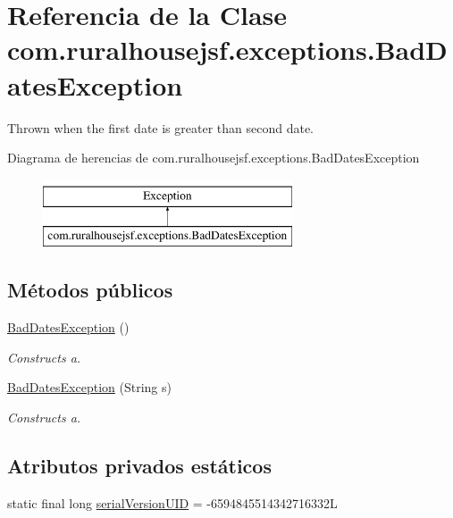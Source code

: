 \hypertarget{a00208}{}\section{Referencia de la Clase com.\+ruralhousejsf.\+exceptions.\+Bad\+Dates\+Exception}
\label{a00208}


Thrown when the first date is greater than second date.  


Diagrama de herencias de com.\+ruralhousejsf.\+exceptions.\+Bad\+Dates\+Exception\begin{figure}[H]
\begin{center}
\leavevmode
\includegraphics[height=2.000000cm]{a00208}
\end{center}
\end{figure}
\subsection*{Métodos públicos}
\begin{DoxyCompactItemize}
\item 
\mbox{\hyperlink{a00208_a0e519d0653a6b74703c8d586c3dca1bc}{Bad\+Dates\+Exception}} ()
\begin{DoxyCompactList}\small\item\em Constructs a. \end{DoxyCompactList}\item 
\mbox{\hyperlink{a00208_ace7222589b4c31c6b4a3d44d952c512a}{Bad\+Dates\+Exception}} (String s)
\begin{DoxyCompactList}\small\item\em Constructs a. \end{DoxyCompactList}\end{DoxyCompactItemize}
\subsection*{Atributos privados estáticos}
\begin{DoxyCompactItemize}
\item 
static final long \mbox{\hyperlink{a00208_a455e5569f117b53852ac14206bb2177f}{serial\+Version\+U\+ID}} = -\/6594845514342716332L
\end{DoxyCompactItemize}


